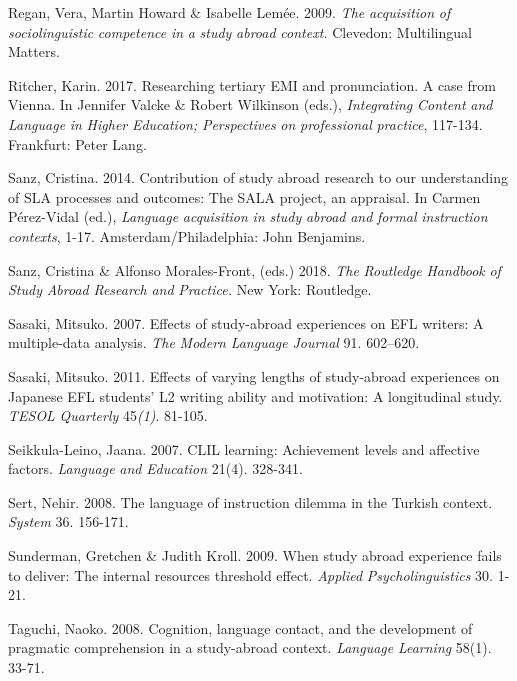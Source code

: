 Regan, Vera, Martin Howard \& Isabelle Lemée. 2009. \textit{The} \textit{acquisition} \textit{of} \textit{sociolinguistic} \textit{competence} \textit{in} \textit{a} \textit{study} \textit{abroad} \textit{context.} Clevedon: Multilingual Matters.

Ritcher, Karin. 2017. Researching tertiary EMI and pronunciation. A case from Vienna. In Jennifer Valcke \& Robert Wilkinson (eds.), \textit{Integrating} \textit{Content} \textit{and} \textit{Language} \textit{in} \textit{Higher} \textit{Education;} \textit{Perspectives} \textit{on} \textit{professional} \textit{practice}, 117-134. Frankfurt: Peter Lang. 

Sanz, Cristina. 2014. Contribution of study abroad research to our understanding of SLA processes and outcomes: The SALA project, an appraisal. In Carmen Pérez-Vidal (ed.), \textit{Language} \textit{acquisition} \textit{in} \textit{study} \textit{abroad} \textit{and} \textit{formal} \textit{instruction} \textit{contexts}, 1-17. Amsterdam/Philadelphia: John Benjamins.

Sanz, Cristina \& Alfonso Morales-Front, (eds.) 2018. \textit{The} \textit{Routledge} \textit{Handbook} \textit{of} \textit{Study} \textit{Abroad} \textit{Research} \textit{and} \textit{Practice.} New York: Routledge. 

Sasaki, Mitsuko. 2007. Effects of study-abroad experiences on EFL writers: A multiple-data analysis. \textit{The} \textit{Modern} \textit{Language} \textit{Journal} 91. 602–620.

Sasaki, Mitsuko. 2011. Effects of varying lengths of study-abroad experiences on Japanese EFL students’ L2 writing ability and motivation: A longitudinal study. \textit{TESOL} \textit{Quarterly} 45\textit{(1)}. 81-105.

Seikkula-Leino, Jaana. 2007. CLIL learning: Achievement levels and affective factors. \textit{Language} \textit{and} \textit{Education} 21(4). 328-341.

Sert, Nehir. 2008. The language of instruction dilemma in the Turkish context.  \textit{System} 36. 156-171.

Sunderman, Gretchen \& Judith Kroll. 2009. When study abroad experience fails to deliver: The internal resources threshold effect. \textit{Applied} \textit{Psycholinguistics} 30. 1-21.

Taguchi, Naoko. 2008. Cognition, language contact, and the development of pragmatic comprehension in a study-abroad context. \textit{Language} \textit{Learning} 58(1). 33-71. 

